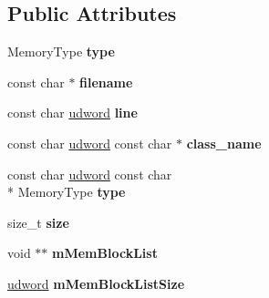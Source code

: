\subsection*{Public Attributes}
\begin{DoxyCompactItemize}
\item 
\hypertarget{class_default_allocator_af44fa579db7f64a3d8cc022d7c039b8a}{Memory\+Type {\bfseries type}}\label{class_default_allocator_af44fa579db7f64a3d8cc022d7c039b8a}

\item 
\hypertarget{class_default_allocator_aec170a663718dcb0895ee5703179e90a}{const char $\ast$ {\bfseries filename}}\label{class_default_allocator_aec170a663718dcb0895ee5703179e90a}

\item 
\hypertarget{class_default_allocator_a1530dadd98c489a9b1a170bd1c8ca978}{const char \hyperlink{_ice_types_8h_a44c6f1920ba5551225fb534f9d1a1733}{udword} {\bfseries line}}\label{class_default_allocator_a1530dadd98c489a9b1a170bd1c8ca978}

\item 
\hypertarget{class_default_allocator_a663006da54d37617b8534a8e935d8b9a}{const char \hyperlink{_ice_types_8h_a44c6f1920ba5551225fb534f9d1a1733}{udword} const char $\ast$ {\bfseries class\+\_\+name}}\label{class_default_allocator_a663006da54d37617b8534a8e935d8b9a}

\item 
\hypertarget{class_default_allocator_a6bbb33ce78f6149673f39deff22d5289}{const char \hyperlink{_ice_types_8h_a44c6f1920ba5551225fb534f9d1a1733}{udword} const char \\*
Memory\+Type {\bfseries type}}\label{class_default_allocator_a6bbb33ce78f6149673f39deff22d5289}

\item 
\hypertarget{class_default_allocator_a65d445eaa236573fb1fb4da21e8cce5b}{size\+\_\+t {\bfseries size}}\label{class_default_allocator_a65d445eaa236573fb1fb4da21e8cce5b}

\item 
\hypertarget{class_default_allocator_a97c28f66acd20d15641e072879dac30a}{void $\ast$$\ast$ {\bfseries m\+Mem\+Block\+List}}\label{class_default_allocator_a97c28f66acd20d15641e072879dac30a}

\item 
\hypertarget{class_default_allocator_a9724b7c265cab26e974e23b1cf957869}{\hyperlink{_ice_types_8h_a44c6f1920ba5551225fb534f9d1a1733}{udword} {\bfseries m\+Mem\+Block\+List\+Size}}\label{class_default_allocator_a9724b7c265cab26e974e23b1cf957869}


\end{DoxyCompactItemize}
